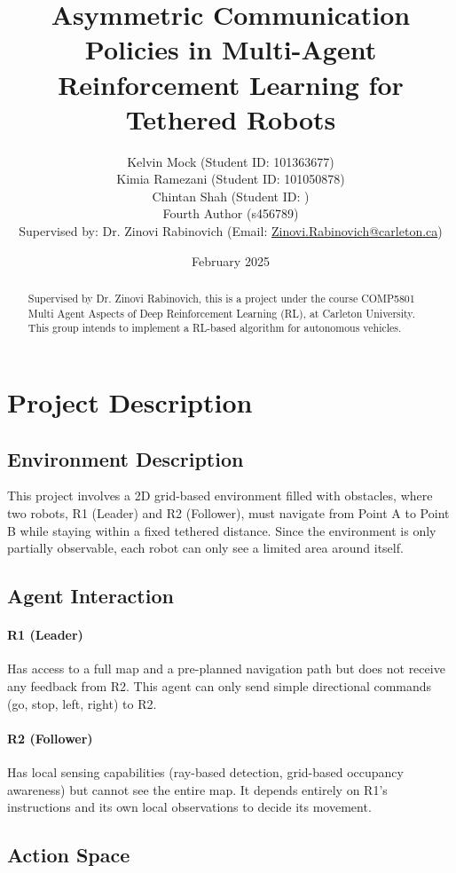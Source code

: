 \documentclass[a4paper,11pt]{article}
\title{Asymmetric Communication Policies in Multi-Agent Reinforcement Learning for Tethered Robots}
\author{
  Kelvin Mock (Student ID: 101363677)
  \\
  Kimia Ramezani (Student ID: 101050878)
  \\
  Chintan Shah (Student ID: )
  \\
  Fourth Author (s456789)
  \\
  Supervised by: Dr. Zinovi Rabinovich (Email: \url{Zinovi.Rabinovich@carleton.ca})
}
\date{February 2025}
\begin{document}
\maketitle

\begin{abstract}
Supervised by Dr. Zinovi Rabinovich, this is a project under the course COMP5801 Multi Agent Aspects of Deep Reinforcement Learning (RL), at Carleton University. This group intends to implement a RL-based algorithm for autonomous vehicles.
\end{abstract}

\section{Project Description}

\subsection{Environment Description}

This project involves a 2D grid-based environment filled with obstacles, where two robots, R1 (Leader) and R2 (Follower), must navigate from Point A to Point B while staying within a fixed tethered distance. Since the environment is only partially observable, each robot can only see a limited area around itself.

\subsection{Agent Interaction}

\paragraph{R1 (Leader)} Has access to a full map and a pre-planned navigation path but does not receive any feedback from R2. This agent can only send simple directional commands (go, stop, left, right) to R2.

\paragraph{R2 (Follower)} Has local sensing capabilities (ray-based detection, grid-based occupancy awareness) but cannot see the entire map. It depends entirely on R1’s instructions and its own local observations to decide its movement.

\subsection{Action Space}
\end{document}
